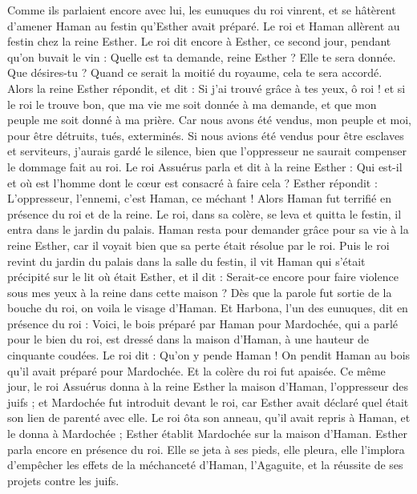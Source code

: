 \begin{multicols}{2}
Comme ils parlaient encore avec lui, les eunuques du roi vinrent, et se hâtèrent d'amener Haman au festin qu'Esther avait préparé.
\VerseOne{}Le roi et Haman allèrent au festin chez la reine Esther.
Le roi dit encore à Esther, ce second jour, pendant qu’on buvait le vin : Quelle est ta demande, reine Esther ? Elle te sera donnée. Que désires-tu ? Quand ce serait la moitié du royaume, cela te sera accordé.
Alors la reine Esther répondit, et dit : Si j'ai trouvé grâce à tes yeux, ô roi ! et si le roi le trouve bon, que ma vie me soit donnée à ma demande, et que mon peuple me soit donné à ma prière.
Car nous avons été vendus, mon peuple et moi, pour être détruits, tués, exterminés. Si nous avions été vendus pour être esclaves et serviteurs, j’aurais gardé le silence, bien que l'oppresseur ne saurait compenser le dommage fait au roi.
Le roi Assuérus parla et dit à la reine Esther : Qui est-il et où est l’homme dont le cœur est consacré à faire cela ?
Esther répondit : L'oppresseur, l'ennemi, c’est Haman, ce méchant ! Alors Haman fut terrifié en présence du roi et de la reine.
Le roi, dans sa colère, se leva et quitta le festin, il entra dans le jardin du palais. Haman resta pour demander grâce pour sa vie à la reine Esther, car il voyait bien que sa perte était résolue par le roi.
Puis le roi revint du jardin du palais dans la salle du festin, il vit Haman qui s’était précipité sur le lit où était Esther, et il dit : Serait-ce encore pour faire violence sous mes yeux à la reine dans cette maison ? Dès que la parole fut sortie de la bouche du roi, on voila le visage d'Haman.
Et Harbona, l'un des eunuques, dit en présence du roi : Voici, le bois préparé par Haman pour Mardochée, qui a parlé pour le bien du roi, est dressé dans la maison d'Haman, à une hauteur de cinquante coudées. Le roi dit : Qu’on y pende Haman !
On pendit Haman au bois qu'il avait préparé pour Mardochée. Et la colère du roi fut apaisée.
\VerseOne{}Ce même jour, le roi Assuérus donna à la reine Esther la maison d'Haman, l'oppresseur des juifs ; et Mardochée fut introduit devant le roi, car Esther avait déclaré quel était son lien de parenté avec elle.
Le roi ôta son anneau, qu'il avait repris à Haman, et le donna à Mardochée ; Esther établit Mardochée sur la maison d'Haman.
Esther parla encore en présence du roi. Elle se jeta à ses pieds, elle pleura, elle l’implora d’empêcher les effets de la méchanceté d'Haman, l’Agaguite, et la réussite de ses projets contre les juifs.

\end{multicols}
